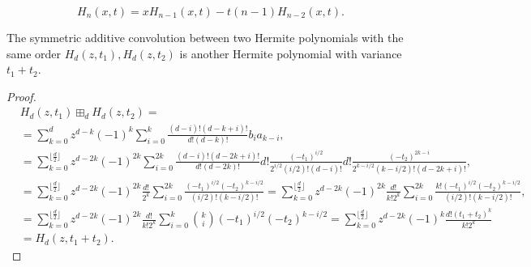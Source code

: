 \begin{equation} \label{eq:recursion_hermite}
    H_n(x,t) = x H_{n-1}(x,t) - t(n-1)H_{n-2}(x,t).
\end{equation}



\begin{proposition}
The symmetric additive convolution between two Hermite polynomials with the same order $H_d(z,t_1), H_d(z,t_2)$ is another Hermite polynomial with variance $t_1 + t_2$.
\end{proposition}

\begin{proof}
    \begin{align*}
        &H_d(z,t_1) \boxplus_d H_d(z,t_2) = \\ 
        &= \sum_{k=0}^d z^{d-k}(-1)^k \sum_{i=0}^k \frac{(d-i)!(d-k+i)!}{d!(d-k)!} b_i a_{k-i}, \\ 
        &= \sum_{k=0}^{\lfloor \frac d2 \rfloor} z^{d-2k}(-1)^{2k} \sum_{i=0}^{2k} \frac{(d-i)!(d-2k+i)!}{d!(d-2k)!}d! \frac{(-t_1)^{i/2}}{2^{i/2} (i/2)! (d-i)!}d! \frac{(-t_2)^{2k-i}}{2^{k-i/2} (k-i/2)! (d-2k+i)!},\\ 
        &= \sum_{k=0}^{\lfloor \frac d2 \rfloor} z^{d-2k}(-1)^{2k} \frac{d!}{2^k} \sum_{i=0}^{2k} \frac{(-t_1)^{i/2}(-t_2)^{k-i/2}}{(i/2)!(k-i/2)!} = \sum_{k=0}^{\lfloor \frac d2 \rfloor} z^{d-2k}(-1)^{2k} \frac{d!}{k!2^k} \sum_{i=0}^{2k} \frac{k!(-t_1)^{i/2}(-t_2)^{k-i/2}}{(i/2)!(k-i/2)!}, \\ 
        &= \sum_{k=0}^{\lfloor \frac d2 \rfloor} z^{d-2k}(-1)^{2k} \frac{d!}{k!2^k} \sum_{i=0}^{k} \binom{k}{i}(-t_1)^{i/2}(-t_2)^{k-i/2} = \sum_{k=0}^{\lfloor \frac d2 \rfloor} z^{d-2k}(-1)^{k} \frac{d!(t_1 + t_2)^k }{k!2^k}\\ 
        &= H_d(z,t_1+t_2).
    \end{align*}
\end{proof}




